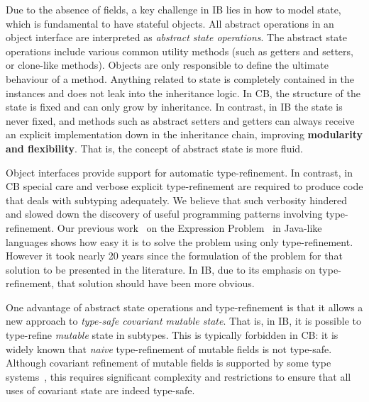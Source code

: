 Due to the absence of fields, a key challenge in IB lies in how to model state, which is
fundamental to have stateful objects. All abstract operations in an
object interface are interpreted as \emph{abstract state
  operations}. The abstract state operations include various common
utility methods (such as getters and setters, or clone-like
methods). Objects are only responsible to define the ultimate
behaviour of a method. %
Anything related to state is completely contained in the
instances and does not leak into the inheritance logic.  In CB, the structure of the state is fixed and can only grow
by inheritance.  In contrast, in IB the state is never
fixed, and methods such as abstract setters and getters
can always receive an explicit implementation down in the inheritance
chain, improving \textbf{modularity and flexibility}.  That is, the
concept of abstract state is more fluid.

Object interfaces provide support for automatic type-refinement.  In
contrast, in CB special care and verbose explicit type-refinement are
required to produce code that deals with subtyping adequately. We
believe that such verbosity hindered and slowed down the discovery of
useful programming patterns involving type-refinement. Our previous work~\cite{eptrivially} 
on the Expression Problem~\cite{wadler98expression} in Java-like languages shows how
easy it is to solve the problem using only type-refinement. However it
took nearly 20 years since the formulation of the problem for that
solution to be presented in the literature. In IB, due to its emphasis
on type-refinement, that solution should have been more obvious.

One advantage of abstract state operations and
type-refinement is that it allows a new approach to
\emph{type-safe covariant mutable state}. That is, in IB,
it is possible to type-refine \emph{mutable} state in subtypes. This is
typically forbidden in CB: it is widely known that \emph{naive} type-refinement of
mutable fields is not type-safe. Although covariant refinement of mutable
fields is supported by some type systems~\cite{bruce98astatically,bruce1994paradigmatic,ernst06virtual,Saito2013933}, this requires
significant complexity and restrictions to ensure that all uses of
covariant state are indeed type-safe.

\begin{comment}
\marcoT{%

In this paper we show how to support type-safe
\textbf{field removal},
\textbf{field type refinement} allowing a kind of covariant setters refinement,
and \textbf{multiple inheritance}.}
\end{comment}

